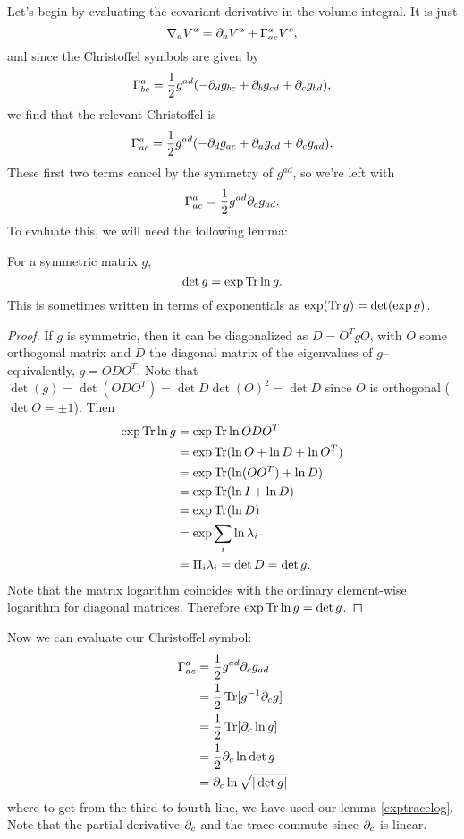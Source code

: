 Let's begin by evaluating the covariant derivative in the volume integral. It is just
$$\nabla_a V^a=\partial_a V^a +\Gamma^a_{ac} V^c,$$
and since the Christoffel symbols are given by
$$\Gamma^a_{bc}=\frac{1}{2}g^{ad}(-\partial_d g_{bc}+\partial_b g_{cd}+\partial_c g_{bd}),$$
we find that the relevant Christoffel is
$$\Gamma^a_{ac}=\frac{1}{2}g^{ad}(-\partial_d g_{ac}+\partial_a g_{cd}+\partial_c g_{ad}).$$
These first two terms cancel by the symmetry of $g^{ad}$, so we're left with
\begin{equation}
    \Gamma^a_{ac}= \frac{1}{2} g^{ad}\partial_c g_{ad}.
\end{equation}
To evaluate this, we will need the following lemma:
\begin{lem}\label{exptracelog}
For a symmetric matrix $g$,
$$\det g = \exp \operatorname{Tr} \ln g.$$
This is sometimes written in terms of exponentials as $\exp (\operatorname{Tr} g)=\det (\exp g)$.
\end{lem}
\begin{proof}
If $g$ is symmetric, then it can be diagonalized as $D=O^T g O$, with $O$ some orthogonal matrix and $D$ the diagonal matrix of the eigenvalues of $g$-- equivalently, $g=O DO^T.$ Note that $\det(g)=\det(O DO^T)=\det D \det(O)^2=\det D$ since $O$ is orthogonal ($\det O = \pm 1$). Then
\begin{align*}
\exp \operatorname{Tr} \ln g &=\exp \operatorname{Tr}\ln ODO^T\\
&=\exp \operatorname{Tr}(\ln O + \ln D + \ln O^T)\\
&=\exp \operatorname{Tr}(\ln (O O ^T)+\ln D)\\
&=\exp \operatorname{Tr}(\ln I + \ln D)\\
&= \exp \operatorname{Tr}(\ln D)\\
&=\exp \sum_i \ln \lambda_i\\
&=\Pi_i \lambda_i = \det D = \det g.
\end{align*}
Note that the matrix logarithm coincides with the ordinary element-wise logarithm for diagonal matrices. Therefore $\exp \operatorname{Tr} \ln g=\det g$.
\end{proof}

Now we can evaluate our Christoffel symbol:
\begin{align*}
\Gamma^a_{ac}&= \frac{1}{2} g^{ad}\partial_c g_{ad}\\
&=\frac{1}{2} \operatorname{Tr} [g^{-1}\partial_c g]\\
&= \frac{1}{2}\operatorname{Tr}[\partial_c \ln g]\\
&=\frac{1}{2} \partial_c \ln \det g\\
&=\partial_c \ln \sqrt{|\det g|}
\end{align*}
where to get from the third to fourth line, we have used our lemma \ref{exptracelog}. Note that the partial derivative $\partial_c$ and the trace commute since $\partial_c$ is linear.

